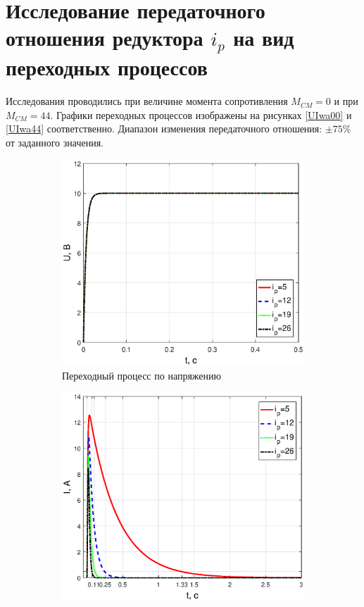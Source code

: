 \documentclass[12pt,a4paper]{article}
\begin{document}
\newpage
\section{Исследование передаточного отношения редуктора $i_p$ на вид переходных процессов}
Исследования проводились при величине момента сопротивления $M_{CM}=0$ и при $M_{CM}=44$. Графики переходных процессов изображены на рисунках \ref{UIwa00} и \ref{UIwa44} соответственно. Диапазон изменения передаточного отношения: $\pm 75\%$  от заданного значения. 
\begin{figure}[H]
	\centering
	\begin{subfigure}[b]{0.48\textwidth}
	    \includegraphics[width = \textwidth]{U3_0}
		\caption{Переходный процесс по напряжению}
	\end{subfigure}
	\hfill
	\begin{subfigure}[b]{0.48\textwidth}
		\includegraphics[width = \textwidth]{I3_0}

\end{subfigure}
\end{figure}
\end{document}
